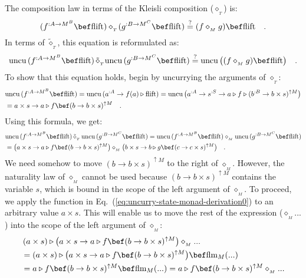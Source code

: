 The composition law in terms of the Kleisli composition ($\diamond_{_{T}}$)
is:
\[
(f^{:A\rightarrow M^{B}}\bef\text{flift})\diamond_{_{T}}\!(g^{:B\rightarrow M^{C}}\bef\text{flift})\overset{?}{=}(f\diamond_{_{M}}g)\bef\text{flift}\quad.
\]
In terms of $\tilde{\diamond}_{_{T}}$, this equation is reformulated
as:
\[
\text{uncu}\,(f^{:A\rightarrow M^{B}}\bef\text{flift})\,\tilde{\diamond}_{_{T}}\text{uncu}\,(g^{:B\rightarrow M^{C}}\bef\text{flift})\overset{?}{=}\text{uncu}\,\big((f\diamond_{_{M}}g)\bef\text{flift}\big)\quad.
\]
To show that this equation holds, begin by uncurrying the arguments
of $\diamond_{_{T}}$:
\begin{align*}
 & \text{uncu}\,(f^{:A\rightarrow M^{B}}\bef\text{flift})=\text{uncu}\,(a^{:A}\rightarrow f(a)\triangleright\text{flift})=\text{uncu}\,\big(a^{:A}\rightarrow s^{:S}\rightarrow a\triangleright f\triangleright(b^{:B}\rightarrow b\times s)^{\uparrow M}\big)\\
 & =a\times s\rightarrow a\triangleright f\bef(b\rightarrow b\times s)^{\uparrow M}\quad.
\end{align*}
Using this formula, we get:
\begin{align}
 & \text{uncu}\,(f^{:A\rightarrow M^{B}}\bef\text{flift})\,\tilde{\diamond}_{_{T}}\,\text{uncu}\,(g^{:B\rightarrow M^{C}}\bef\text{flift})=\text{uncu}\,(f^{:A\rightarrow M^{B}}\bef\text{flift})\diamond_{_{M}}\text{uncu}\,(g^{:B\rightarrow M^{C}}\bef\text{flift})\nonumber \\
 & =\big(a\times s\rightarrow a\triangleright f\bef(b\rightarrow b\times s)^{\uparrow M}\big)\diamond_{_{M}}\big(b\times s\rightarrow b\triangleright g\bef(c\rightarrow c\times s)^{\uparrow M}\big)\quad.\label{eq:uncurry-state-monad-derivation0}
\end{align}
We need somehow to move $(b\rightarrow b\times s)^{\uparrow M}$ to
the right of $\diamond_{_{M}}$. However, the naturality law of $\diamond_{_{M}}$
cannot be used because $(b\rightarrow b\times s)^{\uparrow M}$ contains
the variable $s$, which is bound in the scope of the left argument
of $\diamond_{_{M}}$. To proceed, we apply the function in Eq.~(\ref{eq:uncurry-state-monad-derivation0})
to an arbitrary value $a\times s$. This will enable us to move the
rest of the expression ($\diamond_{_{M}}...$) into the scope of the
left argument of $\diamond_{_{M}}$:
\begin{align*}
 & \left(a\times s\right)\triangleright\big(a\times s\rightarrow a\triangleright f\bef(b\rightarrow b\times s)^{\uparrow M}\big)\diamond_{_{M}}...\\
 & =\left(a\times s\right)\triangleright\big(a\times s\rightarrow a\triangleright f\bef(b\rightarrow b\times s)^{\uparrow M}\big)\bef\text{flm}_{M}(...)\\
 & =a\triangleright f\bef(b\rightarrow b\times s)^{\uparrow M}\bef\text{flm}_{M}(...)=a\triangleright f\bef(b\rightarrow b\times s)^{\uparrow M}\diamond_{_{M}}...
\end{align*}
